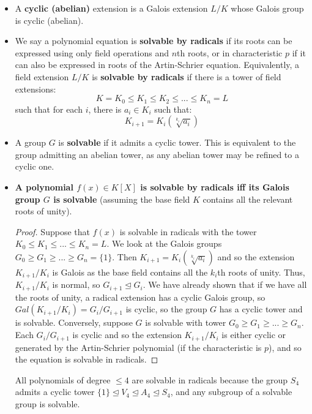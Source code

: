 \documentclass[11pt, oneside]{amsart}   	%
\theoremstyle{definition}
\begin{document}
\begin{itemize}

	\item A \textbf{cyclic (abelian)} extension is a Galois extension $L / K$ whose Galois group is cyclic (abelian).
	
	\item We say a polynomial equation is \textbf{solvable by radicals} if its roots can be expressed using only field operations and $n$th roots, or in 
	characteristic $p$ if it can also be expressed in roots of the Artin-Schrier equation. Equivalently, a field extension $L / K$ is \textbf{solvable by radicals} 
	if there is a tower of field extensions:
	$$
		K = K_0 \leq K_1 \leq K_2\leq ... \leq K_n = L
	$$
	such that for each $i$, there is $a_i\in K_i$ such that:
	$$
		K_{i + 1} = K_i(\sqrt[k_i]{a_i})
	$$
	
	\item A group $G$ is \textbf{solvable} if it admits a cyclic tower. This is equivalent to the group admitting an abelian tower, as any abelian tower may 
	be refined to a cyclic one.
	
	\item \textbf{A polynomial $f(x)\in K[X]$ is solvable by radicals iff its Galois group $G$ is solvable} (assuming the base field $K$ contains all the 
	relevant roots of unity).
	
	\begin{proof}
	
		Suppose that $f(x)$ is solvable in radicals with the tower $K_0\leq K_1\leq ... \leq K_n = L$. We look at the Galois groups $G_0\geq G_1\geq ... 
		\geq G_n = \{1\}$. Then $K_{i + 1} = K_i(\sqrt[k_i]{a_i})$ and so the extension $K_{i + 1} / K_i$ is Galois as the base field contains all the $k_i$th 
		roots of unity. Thus, $K_{i + 1} / K_i$ is normal, so $G_{i + 1}\trianglelefteq G_i$. We have already shown that if we have all the roots of unity, a 
		radical extension has a cyclic Galois group, so $Gal(K_{i + 1} / K_i) = G_i / G_{i + 1}$ is cyclic, so the group $G$ has a cyclic tower and is 
		solvable. Conversely, suppose $G$ is solvable with tower $G_0\geq G_1\geq ... \geq G_n$. Each $G_i / G_{i + 1}$ is cyclic and so the extension 
		$K_{i + 1} / K_i$ is either cyclic or generated by the Artin-Schrier polynomial (if the characteristic is $p$), and so the equation is solvable in 
		radicals.
	
	\end{proof}
	
	All polynomials of degree $\leq 4$ are solvable in radicals because the group $S_4$ admits a cyclic tower $\{1\}\trianglelefteq V_4\trianglelefteq 
	A_4\trianglelefteq S_4$, and any subgroup of a solvable group is solvable. 
	

\end{itemize}
\end{document}
